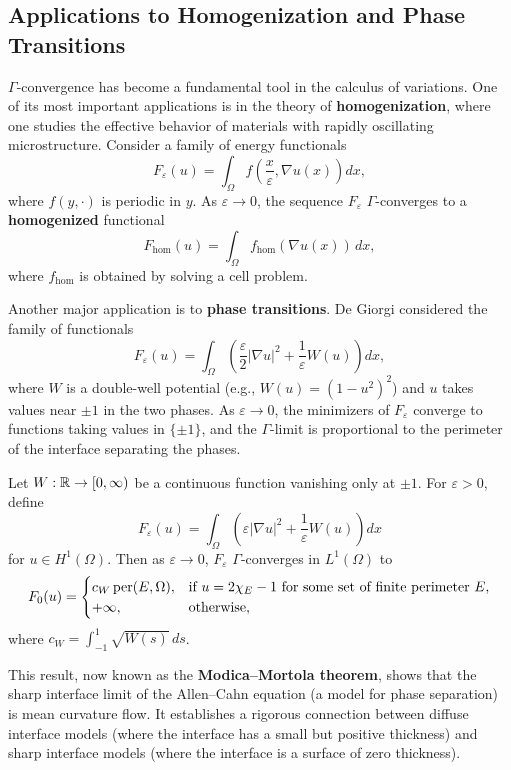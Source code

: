 \subsection{Applications to Homogenization and Phase Transitions}

\(\Gamma\)-convergence has become a fundamental tool in the calculus of variations. One of its most important applications is in the theory of \textbf{homogenization}, where one studies the effective behavior of materials with rapidly oscillating microstructure. Consider a family of energy functionals
\[
F_\varepsilon(u) = \int_\Omega f\left(\frac{x}{\varepsilon}, \nabla u(x)\right) dx,
\]
where \(f(y,\cdot)\) is periodic in \(y\). As \(\varepsilon \to 0\), the sequence \(F_\varepsilon\) \(\Gamma\)-converges to a \textbf{homogenized} functional
\[
F_{\mathrm{hom}}(u) = \int_\Omega f_{\mathrm{hom}}(\nabla u(x))\,dx,
\]
where \(f_{\mathrm{hom}}\) is obtained by solving a cell problem.

Another major application is to \textbf{phase transitions}. De Giorgi considered the family of functionals
\[
F_\varepsilon(u) = \int_\Omega \left( \frac{\varepsilon}{2} |\nabla u|^2 + \frac{1}{\varepsilon} W(u) \right) dx,
\]
where \(W\) is a double-well potential (e.g., \(W(u) = (1-u^2)^2\)) and \(u\) takes values near \(\pm 1\) in the two phases. As \(\varepsilon \to 0\), the minimizers of \(F_\varepsilon\) converge to functions taking values in \(\{\pm 1\}\), and the \(\Gamma\)-limit is proportional to the perimeter of the interface separating the phases.

\begin{theorem}
Let \(W: \mathbb{R} \to [0,\infty)\) be a continuous function vanishing only at \(\pm 1\). For \(\varepsilon > 0\), define
\[
F_\varepsilon(u) = \int_\Omega \left( \varepsilon |\nabla u|^2 + \frac{1}{\varepsilon} W(u) \right) dx
\]
for \(u \in H^1(\Omega)\). Then as \(\varepsilon \to 0\), \(F_\varepsilon\) \(\Gamma\)-converges in \(L^1(\Omega)\) to
\[
F_0(u) = \begin{cases}
c_W \operatorname{per}(E,\Omega), & \text{if } u = 2\chi_E - 1 \text{ for some set of finite perimeter } E,\\
+\infty, & \text{otherwise},
\end{cases}
\]
where \(c_W = \int_{-1}^1 \sqrt{W(s)}\,ds\).
\end{theorem}

This result, now known as the \textbf{Modica--Mortola theorem}, shows that the sharp interface limit of the Allen--Cahn equation (a model for phase separation) is mean curvature flow. It establishes a rigorous connection between diffuse interface models (where the interface has a small but positive thickness) and sharp interface models (where the interface is a surface of zero thickness).

